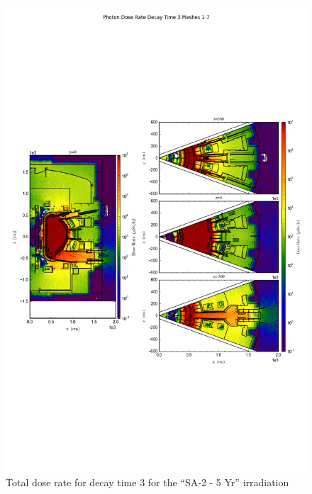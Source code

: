 \documentclass[12pt]{article}
\begin{document}
\clearpage
\begin{figure}[ht!]
\centering
\includegraphics[trim={0cm 8cm, 0cm 8cm},clip,scale=0.75]{../plots/final_model/10year/Photon_Dose_Rate_Decay_Time_3_Meshes_1-7.png}
\caption{Total dose rate for decay time 3 for the ``SA-2 - 5 Yr'' irradiation}
\label{fig:photons_10y_dc3_nob4c_dose}
\end{figure}
\end{document}
